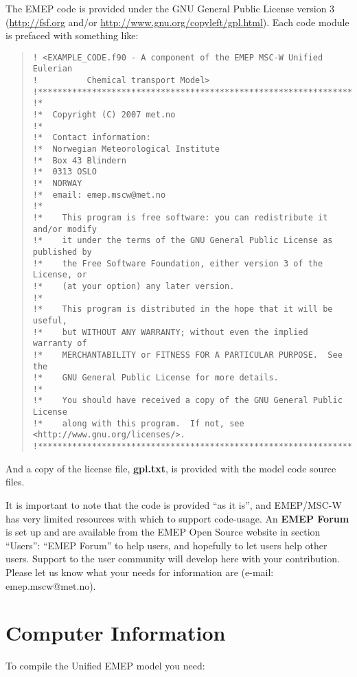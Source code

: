 The EMEP code is provided under the GNU General Public License version 3
(\url{http://fsf.org} and/or
\url{http://www.gnu.org/copyleft/gpl.html}).
\newpage 
Each code module is prefaced with something like:
\begin{quote}
\begin{small}
\begin{verbatim}
! <EXAMPLE_CODE.f90 - A component of the EMEP MSC-W Unified Eulerian
!          Chemical transport Model>
!*****************************************************************************!
!*
!*  Copyright (C) 2007 met.no
!*
!*  Contact information:
!*  Norwegian Meteorological Institute
!*  Box 43 Blindern
!*  0313 OSLO
!*  NORWAY
!*  email: emep.mscw@met.no
!*
!*    This program is free software: you can redistribute it and/or modify
!*    it under the terms of the GNU General Public License as published by
!*    the Free Software Foundation, either version 3 of the License, or
!*    (at your option) any later version.
!*
!*    This program is distributed in the hope that it will be useful,
!*    but WITHOUT ANY WARRANTY; without even the implied warranty of
!*    MERCHANTABILITY or FITNESS FOR A PARTICULAR PURPOSE.  See the
!*    GNU General Public License for more details.
!*
!*    You should have received a copy of the GNU General Public License
!*    along with this program.  If not, see <http://www.gnu.org/licenses/>.
!*****************************************************************************!
\end{verbatim}
\end{small}
\end{quote}
And a copy of the license file, {\bf gpl.txt}, is provided with the
model code source files.

\noindent It is important to note that the code is provided ``as it is'', 
and EMEP/MSC-W has very limited resources with which to support
code-usage. An {\bf EMEP Forum} is set up and are available from the
EMEP Open Source website in section ``Users'': ``EMEP Forum''
to help users, and hopefully to let users help other users.
Support to the user community will develop here with your
contribution. 
Please let us know what your needs for information are 
(e-mail: emep.mscw@met.no).


\section{Computer Information}
\label{sec:compinf}

To compile the Unified EMEP model you need:\\

